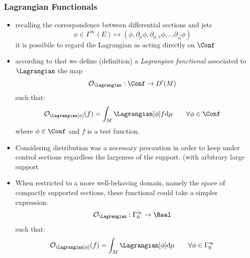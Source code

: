 \documentclass[a4paper,11pt]{scrartcl}
\begin{document}
    \subsubsection*{Lagrangian Functionals}
    \begin{itemize}
        \item recalling the correspondence between differential sections and jets
        $$ \phi \in \Gamma^\infty (E) \mapsto (\phi, \partial_\mu \phi, \partial_{\mu, \nu} \phi , \ldots \partial_{\vec{\alpha}}\phi) $$
        it is possibile to regard the Lagrangian as acting directly on $\Conf$
        \item according to that we define (definition) a \emph{Lagrangian functional} associated to $\Lagrangian$ the map
        $$ \mathcal{O}_\Lagrangian : \Conf \rightarrow D'(M)  $$
        such that:
        $$ \mathcal{O}_\Lagrangian [\phi] (f) = \int_M \Lagrangian [\phi] f \textrm{d}\mu \qquad \forall \phi \in \Conf $$
        where $\phi\in \Conf$ and $f$ is a test function.
        \item Considering distribution was a necessary precaution in order to keep under control sections regardless the largeness of the support. (with arbitrary large support
        \item When restricted to a more well-behaving domain, namely the space of compactly supported sections, these functional could take a simpler expression:
        $$ \mathcal{O}_\Lagrangian : \Gamma_0^\infty \rightarrow \Real  $$
        such that:
        $$ \mathcal{O}_\Lagrangian [\phi] (f) = \int_M \Lagrangian [\phi] \textrm{d}\mu  \qquad \forall \phi \in  \Gamma_0^\infty  $$
    \end{itemize}
\end{document}
